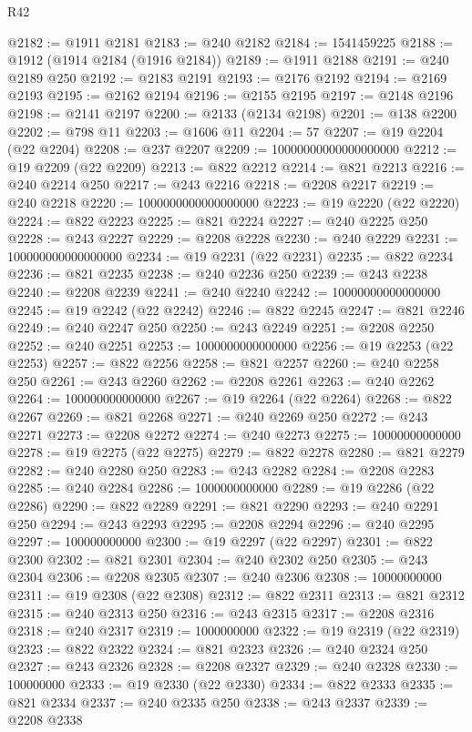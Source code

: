 \begin{lexlean}{R42}
\begin{coremodule}
{@2182 := @1911 @2181
@2183 := @240 @2182
@2184 := 1541459225
@2188 := @1912 (@1914 @2184 (@1916 @2184))
@2189 := @1911 @2188
@2191 := @240 @2189 @250
@2192 := @2183 @2191
@2193 := @2176 @2192
@2194 := @2169 @2193
@2195 := @2162 @2194
@2196 := @2155 @2195
@2197 := @2148 @2196
@2198 := @2141 @2197
@2200 := @2133 (@2134 @2198)
@2201 := @138 @2200
@2202 := @798 @11
@2203 := @1606 @11
@2204 := 57
@2207 := @19 @2204 (@22 @2204)
@2208 := @237 @2207
@2209 := 10000000000000000000
@2212 := @19 @2209 (@22 @2209)
@2213 := @822 @2212
@2214 := @821 @2213
@2216 := @240 @2214 @250
@2217 := @243 @2216
@2218 := @2208 @2217
@2219 := @240 @2218
@2220 := 1000000000000000000
@2223 := @19 @2220 (@22 @2220)
@2224 := @822 @2223
@2225 := @821 @2224
@2227 := @240 @2225 @250
@2228 := @243 @2227
@2229 := @2208 @2228
@2230 := @240 @2229
@2231 := 100000000000000000
@2234 := @19 @2231 (@22 @2231)
@2235 := @822 @2234
@2236 := @821 @2235
@2238 := @240 @2236 @250
@2239 := @243 @2238
@2240 := @2208 @2239
@2241 := @240 @2240
@2242 := 10000000000000000
@2245 := @19 @2242 (@22 @2242)
@2246 := @822 @2245
@2247 := @821 @2246
@2249 := @240 @2247 @250
@2250 := @243 @2249
@2251 := @2208 @2250
@2252 := @240 @2251
@2253 := 1000000000000000
@2256 := @19 @2253 (@22 @2253)
@2257 := @822 @2256
@2258 := @821 @2257
@2260 := @240 @2258 @250
@2261 := @243 @2260
@2262 := @2208 @2261
@2263 := @240 @2262
@2264 := 100000000000000
@2267 := @19 @2264 (@22 @2264)
@2268 := @822 @2267
@2269 := @821 @2268
@2271 := @240 @2269 @250
@2272 := @243 @2271
@2273 := @2208 @2272
@2274 := @240 @2273
@2275 := 10000000000000
@2278 := @19 @2275 (@22 @2275)
@2279 := @822 @2278
@2280 := @821 @2279
@2282 := @240 @2280 @250
@2283 := @243 @2282
@2284 := @2208 @2283
@2285 := @240 @2284
@2286 := 1000000000000
@2289 := @19 @2286 (@22 @2286)
@2290 := @822 @2289
@2291 := @821 @2290
@2293 := @240 @2291 @250
@2294 := @243 @2293
@2295 := @2208 @2294
@2296 := @240 @2295
@2297 := 100000000000
@2300 := @19 @2297 (@22 @2297)
@2301 := @822 @2300
@2302 := @821 @2301
@2304 := @240 @2302 @250
@2305 := @243 @2304
@2306 := @2208 @2305
@2307 := @240 @2306
@2308 := 10000000000
@2311 := @19 @2308 (@22 @2308)
@2312 := @822 @2311
@2313 := @821 @2312
@2315 := @240 @2313 @250
@2316 := @243 @2315
@2317 := @2208 @2316
@2318 := @240 @2317
@2319 := 1000000000
@2322 := @19 @2319 (@22 @2319)
@2323 := @822 @2322
@2324 := @821 @2323
@2326 := @240 @2324 @250
@2327 := @243 @2326
@2328 := @2208 @2327
@2329 := @240 @2328
@2330 := 100000000
@2333 := @19 @2330 (@22 @2330)
@2334 := @822 @2333
@2335 := @821 @2334
@2337 := @240 @2335 @250
@2338 := @243 @2337
@2339 := @2208 @2338
}
\end{coremodule}
\end{lexlean}
